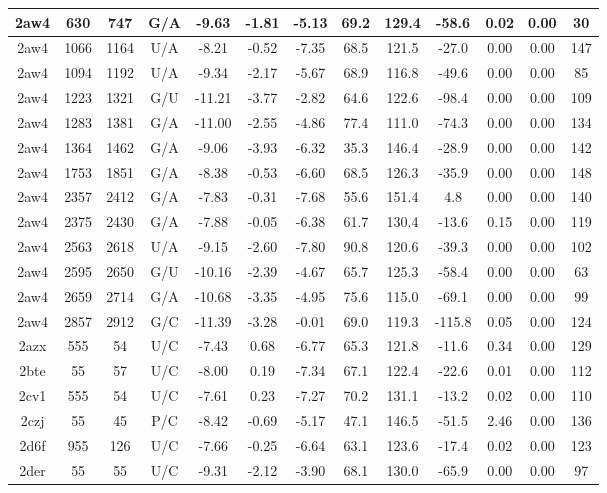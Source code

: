 {\begin{center}
\begin{longtable}{|c|c|c|c|c|c|c|c|c|c|c|c|c|}
2aw4 & 630 & 747 & G/A & -9.63 & -1.81 & -5.13 & 69.2 & 129.4 & -58.6 & 0.02 & 0.00 & 30 \\ \hline
2aw4 & 1066 & 1164 & U/A & -8.21 & -0.52 & -7.35 & 68.5 & 121.5 & -27.0 & 0.00 & 0.00 & 147 \\ \hline
2aw4 & 1094 & 1192 & U/A & -9.34 & -2.17 & -5.67 & 68.9 & 116.8 & -49.6 & 0.00 & 0.00 & 85 \\ \hline
2aw4 & 1223 & 1321 & G/U & -11.21 & -3.77 & -2.82 & 64.6 & 122.6 & -98.4 & 0.00 & 0.00 & 109 \\ \hline
2aw4 & 1283 & 1381 & G/A & -11.00 & -2.55 & -4.86 & 77.4 & 111.0 & -74.3 & 0.00 & 0.00 & 134 \\ \hline
2aw4 & 1364 & 1462 & G/A & -9.06 & -3.93 & -6.32 & 35.3 & 146.4 & -28.9 & 0.00 & 0.00 & 142 \\ \hline
2aw4 & 1753 & 1851 & G/A & -8.38 & -0.53 & -6.60 & 68.5 & 126.3 & -35.9 & 0.00 & 0.00 & 148 \\ \hline
2aw4 & 2357 & 2412 & G/A & -7.83 & -0.31 & -7.68 & 55.6 & 151.4 & 4.8 & 0.00 & 0.00 & 140 \\ \hline
2aw4 & 2375 & 2430 & G/A & -7.88 & -0.05 & -6.38 & 61.7 & 130.4 & -13.6 & 0.15 & 0.00 & 119 \\ \hline
2aw4 & 2563 & 2618 & U/A & -9.15 & -2.60 & -7.80 & 90.8 & 120.6 & -39.3 & 0.00 & 0.00 & 102 \\ \hline
2aw4 & 2595 & 2650 & G/U & -10.16 & -2.39 & -4.67 & 65.7 & 125.3 & -58.4 & 0.00 & 0.00 & 63 \\ \hline
2aw4 & 2659 & 2714 & G/A & -10.68 & -3.35 & -4.95 & 75.6 & 115.0 & -69.1 & 0.00 & 0.00 & 99 \\ \hline
2aw4 & 2857 & 2912 & G/C & -11.39 & -3.28 & -0.01 & 69.0 & 119.3 & -115.8 & 0.05 & 0.00 & 124 \\ \hline
2azx & 555 & 54 & U/C & -7.43 & 0.68 & -6.77 & 65.3 & 121.8 & -11.6 & 0.34 & 0.00 & 129 \\ \hline
2bte & 55 & 57 & U/C & -8.00 & 0.19 & -7.34 & 67.1 & 122.4 & -22.6 & 0.01 & 0.00 & 112 \\ \hline
2cv1 & 555 & 54 & U/C & -7.61 & 0.23 & -7.27 & 70.2 & 131.1 & -13.2 & 0.02 & 0.00 & 110 \\ \hline
2czj & 55 & 45 & P/C & -8.42 & -0.69 & -5.17 & 47.1 & 146.5 & -51.5 & 2.46 & 0.00 & 136 \\ \hline
2d6f & 955 & 126 & U/C & -7.66 & -0.25 & -6.64 & 63.1 & 123.6 & -17.4 & 0.02 & 0.00 & 123 \\ \hline
2der & 55 & 55 & U/C & -9.31 & -2.12 & -3.90 & 68.1 & 130.0 & -65.9 & 0.00 & 0.00 & 97 \\ \hline

\end{longtable}
\end{center}}
